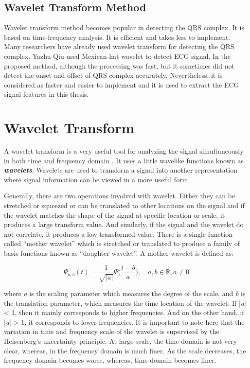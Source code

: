 \subsection{Wavelet Transform Method}
Wavelet transform method becomes popular in detecting the QRS complex. It is based on time-frequency analysis. It is efficient and takes less to implement. Many researchers have already used wavelet transform for detecting the QRS complex. Yazhu Qiu \cite{PMID:17228741} used Mexican-hat wavelet to detect ECG signal. In the proposed method, although the processing was fast, but it sometimes did not detect the onset and offset of QRS complex accurately. Nevertheless, it is considered as faster and easier to implement and it is used to extract the ECG signal features in this thesis.


\section{Wavelet Transform}

A wavelet transform is a very useful tool for analyzing the signal simultaneously in both time and frequency domain \cite{addison2017illustrated}. It uses a little wavelike functions known as \textbf{\textit{wavelets}}. Wavelets are used to transform a signal into another representation where signal information can be viewed in a more useful form.

Generally, there are two operations involved with wavelet. Either they can be stretched or squeezed or can be translated to other locations on the signal and if the wavelet matches the shape of the signal at specific location or scale, it produces a large transform value. And similarly, if the signal and the wavelet do not correlate, it produces a low transformed value. There is a single function called ``mother wavelet'' which is stretched or translated to produce a family of basis functions known as ``daughter wavelet''. A mother wavelet is defined as:

\begin{equation} \label{eqn_mother_wavelet}
{\Psi_{a,b}(t) = \frac{1}{\sqrt{|a|}}\Psi \bigg(\frac{t-b}{a}\bigg),\quad a, b \in \mathbb{R}, a \neq 0}
\end{equation}

where \textit{a} is the scaling parameter which measures the degree of the scale, and \textit{b} is the translation parameter, which measures the time location of the wavelet. If |\textit{a}| < 1, then it mainly corresponds to higher frequencies. And on the other hand, if |\textit{a}| > 1, it corresponds to lower frequencies. It is important to note here that the variation in time and frequency scale of the wavelet is supervised by the Heisenberg's uncertainty principle. At large scale, the time domain is not very clear, whereas, in the frequency domain is much finer. As the scale decreases, the frequency domain becomes worse, whereas, time domain becomes finer.


